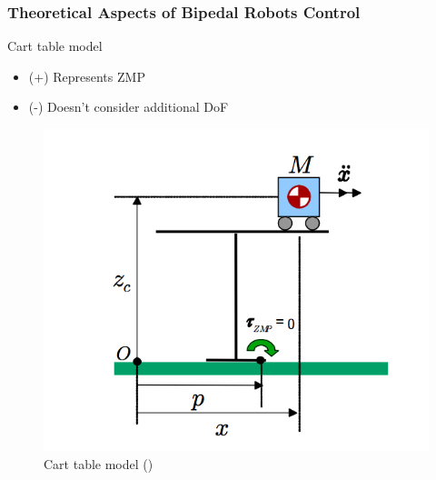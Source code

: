 \documentclass{beamer}
\begin{document}

	\begin{frame}
		\frametitle{Theoretical Aspects of Bipedal Robots Control}
		\begin{block}{Cart table model}
			\begin{itemize}
				\item(+)
				Represents ZMP
				\item(-)
				Doesn't consider additional DoF 
			\end{itemize}
		\end{block}
		
		\begin{figure}[h!]
			\begin{minipage}[H]{\linewidth}
				\centering
				\includegraphics[width=0.5\linewidth]{presentation_images/11}
				\caption{Cart table model (\cite{kajita2003biped})}
			\end{minipage}
		\end{figure}
	\end{frame}
	
\end{document}
